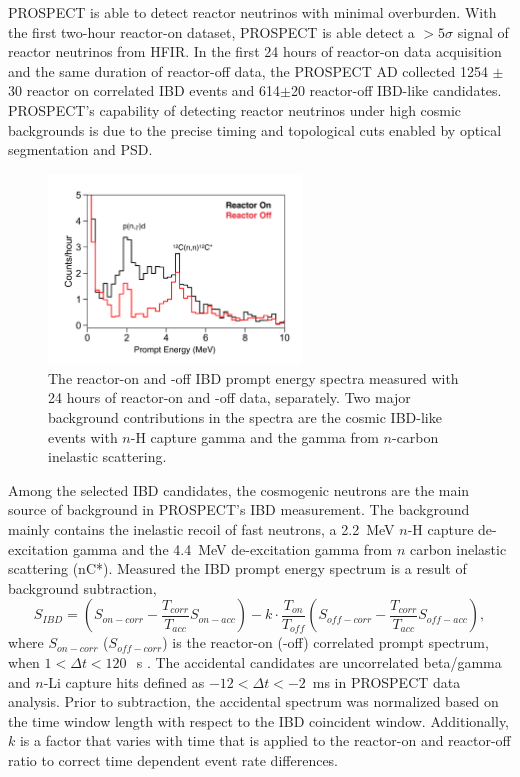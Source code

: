 
PROSPECT is able to detect reactor neutrinos with minimal overburden.
With the first two-hour reactor-on dataset, PROSPECT is able detect a $>5\sigma$ signal of reactor neutrinos from HFIR.
In the first 24 hours of reactor-on data acquisition and the same duration of reactor-off data, the PROSPECT AD collected 1254 $\pm$30 reactor on correlated IBD events and 614$\pm$20 reactor-off IBD-like candidates.
PROSPECT's capability of detecting reactor neutrinos under high cosmic backgrounds is due to the precise timing and topological cuts enabled by optical segmentation and PSD.

\begin{figure}[h!]
    \centering
    \includegraphics[width=0.6\textwidth]{Figures/FirstNeutrino.pdf}
    \caption[Reactor neutrino from HFIR]{The reactor-on and -off IBD prompt energy spectra measured with 24 hours of reactor-on and -off data, separately.
    Two major background contributions in the spectra are the cosmic IBD-like events with $n$-H capture gamma and the gamma from $n$-carbon inelastic scattering.}
    \label{fig:firstnu}
\end{figure}


Among the selected IBD candidates, the cosmogenic neutrons are the main source of background in PROSPECT's IBD measurement.
The background mainly contains the inelastic recoil of fast neutrons, a 2.2~MeV $n$-H capture de-excitation gamma and the 4.4~MeV de-excitation gamma from $n$ carbon inelastic scattering (nC*).
Measured the IBD prompt energy spectrum is a result of background subtraction,
\begin{equation}
S_{IBD} =(S_{on-corr} - \frac{T_{corr}}{T_{acc}}S_{on-acc}) - k\cdot  \frac{T_{on}}{T_{off}} (S_{off-corr} - \frac{T_{corr}}{T_{acc}}S_{off-acc}),
\end{equation} 
where $S_{on-corr}$ ($S_{off-corr}$) is the reactor-on (-off) correlated prompt spectrum, when $1 < \Delta t < 120~$~\textmu s .
The accidental candidates are uncorrelated beta/gamma and $n$-Li capture hits defined as $-12 < \Delta t < -2$~ms in PROSPECT data analysis.
Prior to subtraction, the accidental spectrum was normalized based on the time window length with respect to the IBD coincident window.
Additionally, $k$ is a factor that varies with time that is applied to the reactor-on and reactor-off ratio to correct time dependent event rate differences.

